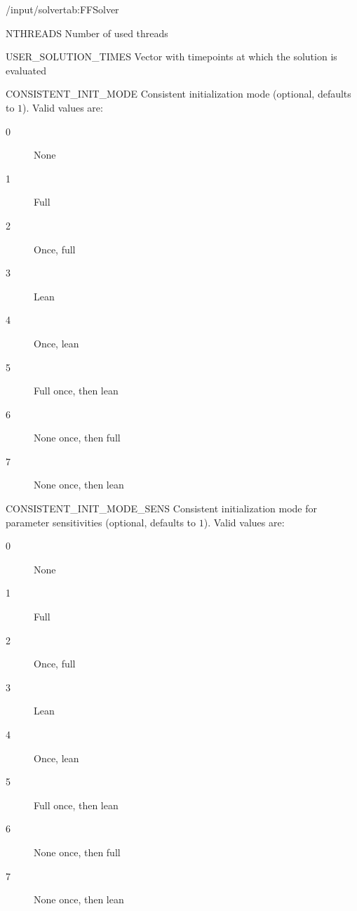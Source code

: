 \begin{groupscope}{/input/solver}{tab:FFSolver}
  \begin{dataset}[type=int,range={$\geq 1$},length=1]{NTHREADS}
    Number of used threads
  \end{dataset}
  \begin{dataset}[type=double,unit={\si{\second}},range={$\geq 0$},length={Arbitrary}]{USER\_SOLUTION\_TIMES}
    Vector with timepoints at which the solution is evaluated
  \end{dataset}
  \begin{dataset}[type=int,range={$\{ 0, \dots, 7\}$},length=1]{CONSISTENT\_INIT\_MODE}
    Consistent initialization mode (optional, defaults to $1$).
    Valid values are:
    \begin{description}
      \item[0] None
      \item[1] Full
      \item[2] Once, full
      \item[3] Lean
      \item[4] Once, lean
      \item[5] Full once, then lean
      \item[6] None once, then full
      \item[7] None once, then lean
    \end{description}\vspace{-\baselineskip}
  \end{dataset}
  \begin{dataset}[type=int,range={$\{ 0, \dots, 7\}$},length=1]{CONSISTENT\_INIT\_MODE\_SENS}
    Consistent initialization mode for parameter sensitivities (optional, defaults to $1$).
    Valid values are:
    \begin{description}
      \item[0] None
      \item[1] Full
      \item[2] Once, full
      \item[3] Lean
      \item[4] Once, lean
      \item[5] Full once, then lean
      \item[6] None once, then full
      \item[7] None once, then lean
    \end{description}\vspace{-\baselineskip}
  \end{dataset}
\end{groupscope}


